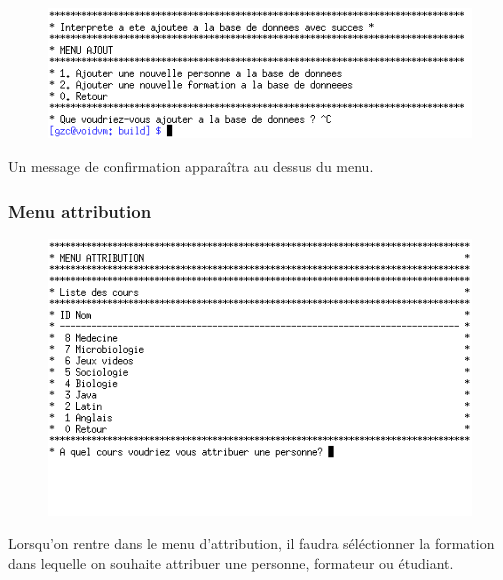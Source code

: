 \documentclass[11pt]{article}
\begin{document}
\begin{figure}[ht]
  \centering
  \includegraphics[trim=0 15 10 10, clip, scale=0.8]{images/12.png.png}
\end{figure}
Un message de confirmation apparaîtra au dessus du menu.

\newpage
\subsubsection{Menu attribution}
\begin{figure}[ht]
  \centering
  \includegraphics[trim=0 60 0 0, clip, scale=0.8]{images/13.png.png}
\end{figure}
Lorsqu'on rentre dans le menu d'attribution, il faudra séléctionner la formation dans lequelle on souhaite attribuer une personne, formateur ou étudiant.
\end{document}
